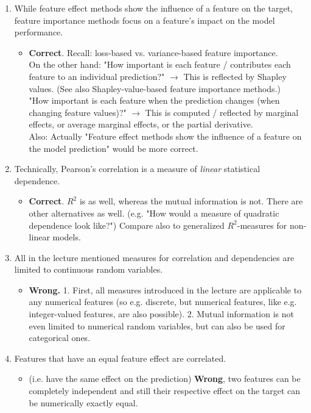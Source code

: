 \begin{enumerate}
    
    \item While feature effect methods show the influence of a feature on the target, feature importance methods focus on a feature's impact on the model performance.
    \begin{itemize}
    	\item[$\Rightarrow$] \textbf{Correct}. Recall: loss-based vs. variance-based feature importance. \\
    	On the other hand: "How important is each feature / contributes each feature to an individual prediction?" \(\rightarrow\) This is reflected by Shapley values. (See also Shapley-value-based feature importance methods.) \\
    	"How important is each feature when the prediction changes (when changing feature values)?" \(\rightarrow\) This is computed / reflected by marginal effects, or average marginal effects, or the partial derivative. \\
    	Also: Actually "Feature effect methods show the influence of a feature on the model prediction" would be more correct.
    \end{itemize}

        \item Technically, Pearson's correlation is a measure of \textit{linear} statistical dependence. 
        \begin{itemize}
        	\item[$\Rightarrow$] \textbf{Correct}. \(R^2\) is as well, whereas the mutual information is not. There are other alternatives as well. (e.g. "How would a measure of quadratic dependence look like?") Compare also to generalized \(R^2\)-measures for non-linear models.
        \end{itemize}
    	\item All in the lecture mentioned measures for correlation and dependencies are limited to continuous random variables.
    	\begin{itemize}
    		\item[$\Rightarrow$] \textbf{Wrong.} 1. First, all measures introduced in the lecture are applicable to any numerical features (so e.g. discrete, but numerical features, like e.g. integer-valued features, are also possible). 2. Mutual information is not even limited to numerical random variables, but can also be used for categorical ones.
    	\end{itemize}
        \item Features that have an equal feature effect are correlated. 
        \begin{itemize}
        	\item[$\Rightarrow$] (i.e. have the same effect on the prediction) \textbf{Wrong}, two features can be completely independent and still their respective effect on the target can be numerically exactly equal.
        \end{itemize}


\end{enumerate}
